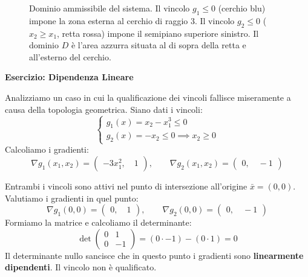 \documentclass[12pt, a4paper]{article}
\newcommand{\separatore}{\noindent{\color{titlecolor!50}\rule{\textwidth}{0.6pt}}}
\begin{document}
	\begin{figure}[H]
		\centering
		\caption{Dominio ammissibile del sistema. Il vincolo $g_1 \le 0$ (cerchio blu) impone la zona esterna al cerchio di raggio 3. Il vincolo $g_2 \le 0$ ($x_2 \ge x_1$, retta rossa) impone il semipiano superiore sinistro. Il dominio $D$ è l'area azzurra situata al di sopra della retta e all'esterno del cerchio.}
	\end{figure}
	
	\vspace{0.6cm}
	\separatore
	\vspace{0.4cm}
	
	\textbf{Esercizio: Dipendenza Lineare}
	
	Analizziamo un caso in cui la qualificazione dei vincoli fallisce miseramente a causa della topologia geometrica. Siano dati i vincoli:
	\[
	\begin{cases}
		g_1(x) = x_2 - x_1^3 \le 0 \\
		g_2(x) = -x_2 \le 0 \implies x_2 \ge 0
	\end{cases}
	\]
	Calcoliamo i gradienti:
	\[
	\nabla g_1(x_1, x_2) = \begin{pmatrix} -3x_1^2, \quad 1 \end{pmatrix}, \qquad \nabla g_2(x_1, x_2) = \begin{pmatrix} 0, \quad -1 \end{pmatrix}
	\]
	
	Entrambi i vincoli sono attivi nel punto di intersezione all'origine $\bar{x} = (0,0)$. Valutiamo i gradienti in quel punto:
	\[
	\nabla g_1(0,0) = \begin{pmatrix} 0,\quad 1 \end{pmatrix}, \qquad \nabla g_2(0,0) = \begin{pmatrix} 0,\quad -1 \end{pmatrix}
	\]
	Formiamo la matrice e calcoliamo il determinante:
	\[
	\det \begin{pmatrix} 0 & 1 \\ 0 & -1 \end{pmatrix} = (0 \cdot -1) - (0 \cdot 1) = 0
	\]
	Il determinante nullo sancisce che in questo punto i gradienti sono \textbf{linearmente dipendenti}. Il vincolo non è qualificato. 
	
\end{document}
